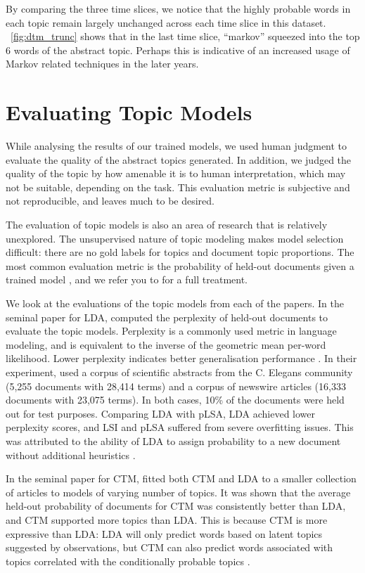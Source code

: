 \documentclass[letterpaper]{article}
\begin{document}
By comparing the three time slices, we notice that the highly probable
words in each topic remain largely unchanged across each time slice in
this dataset. ~\autoref{fig:dtm_trunc} shows that in the last time
slice, ``markov'' squeezed into the top 6 words of the abstract topic.
Perhaps this is indicative of an increased usage of Markov related
techniques in the later years.

\section{Evaluating Topic Models}
\label{sec:evaluation}
While analysing the results of our trained models, we used human
judgment to evaluate the quality of the abstract topics generated. In
addition, we judged the quality of the topic by how amenable it is to
human interpretation, which may not be suitable, depending on the
task. This evaluation metric is subjective and not reproducible, and
leaves much to be desired.

The evaluation of topic models is also an area of research that is
relatively unexplored. The unsupervised nature of topic modeling makes
model selection difficult: there are no gold labels for topics and
document topic proportions. The most common evaluation metric is the
probability of held-out documents given a trained model
\cite{wallach2009evaluation}, and we refer you to
\citeauthor{wallach2009evaluation} for a full treatment.

We look at the evaluations of the topic models from each of the
papers. In the seminal paper for LDA, \citeauthor{blei2003latent}
computed the perplexity of held-out documents to evaluate the topic
models. Perplexity is a commonly used metric in language modeling, and
is equivalent to the inverse of the geometric mean per-word
likelihood. Lower perplexity indicates better generalisation
performance \cite{blei2003latent}. In their experiment,
\citeauthor{blei2003latent} used a corpus of scientific abstracts from
the C. Elegans community (5,255 documents with 28,414 terms) and a
corpus of newswire articles (16,333 documents with 23,075 terms). In
both cases, 10\% of the documents were held out for test purposes.
Comparing LDA with pLSA, LDA achieved lower perplexity scores, and LSI
and pLSA suffered from severe overfitting issues. This was attributed
to the ability of LDA to assign probability to a new document without
additional heuristics \cite{blei2003latent}.

In the seminal paper for CTM, \citeauthor{blei2005correlated} fitted
both CTM and LDA to a smaller collection of articles to models of
varying number of topics. It was shown that the average held-out
probability of documents for CTM was consistently better than LDA, and
CTM supported more topics than LDA. This is because CTM is more
expressive than LDA: LDA will only predict words based on latent
topics suggested by observations, but CTM can also predict words
associated with topics correlated with the conditionally probable
topics \cite{blei2005correlated}.
\end{document}
